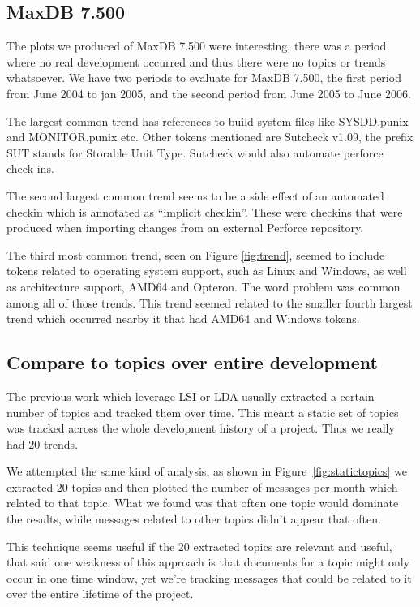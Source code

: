 \documentclass[times, 10pt,twocolumn]{article}
\begin{document}
\subsection{MaxDB 7.500}

The plots we produced of MaxDB 7.500 were interesting, there was a
period where no real development occurred and thus there were no topics or trends
whatsoever. We have two periods to evaluate for MaxDB 7.500, the first
period from June 2004 to jan 2005, and the second period from June
2005 to June 2006.

The largest common trend has references to build system files like
SYSDD.punix and MONITOR.punix etc. Other tokens mentioned are Sutcheck
v1.09, the prefix SUT stands for Storable Unit Type. Sutcheck would
also automate perforce check-ins.

The second largest common trend seems to be a side effect of an
automated checkin which is annotated as ``implicit checkin''. These
were checkins that were produced when importing changes from an
external Perforce repository.

The third most common trend, seen on Figure \ref{fig:trend}, seemed to
include tokens related to operating system support, such as Linux and
Windows, as well as architecture support, AMD64 and Opteron. The word
problem was common among all of those trends. This trend seemed
related to the smaller fourth largest trend which occurred nearby it
that had AMD64 and Windows tokens.

\subsection{Compare to topics over entire development}

The previous work which leverage LSI or LDA usually extracted a
certain number of topics and tracked them over time. This meant a
static set of topics was tracked across the whole development history
of a project. Thus we really had 20 trends. 

We attempted the same kind of analysis, as shown in
Figure~\ref{fig:statictopics} we extracted 20 topics and then plotted
the number of messages per month which related to that topic. What we
found was that often one topic would dominate the results, while
messages related to other topics didn't appear that often.

This technique seems useful if the 20 extracted topics are relevant
and useful, that said one weakness of this approach is that documents
for a topic might only occur in one time window, yet we're tracking
messages that could be related to it over the entire lifetime of the
project.
\end{document}
